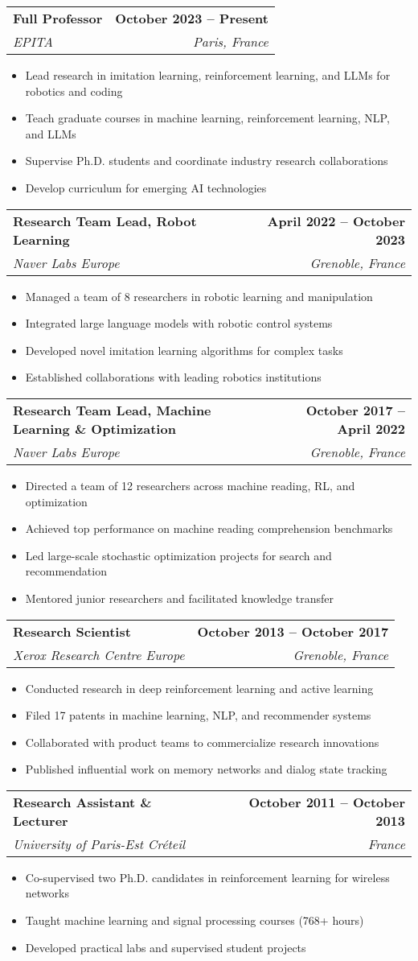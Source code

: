 \documentclass[letterpaper,11pt]{article}
\makeatletter
\newcommand{\resumeItem}[1]{
  \item\small{
    {#1 \vspace{-2pt}}
  }
}
\newcommand{\resumeSubheading}[4]{
  \vspace{-1pt}\item
    \begin{tabular*}{0.97\textwidth}[t]{l@{\extracolsep{\fill}}r}
      \textbf{#1} & \textbf{#2} \\
      \textit{#3} & \textit{#4} \\
    \end{tabular*}\vspace{-8pt}
}
\newcommand{\resumeItemListStart}{\begin{itemize}[leftmargin=0.1in]}
\newcommand{\resumeItemListEnd}{\end{itemize}\vspace{-5pt}}
\makeatother
\begin{document}
    \resumeSubheading
        {Full Professor}{October 2023 -- Present}
        {EPITA}{Paris, France}
        \resumeItemListStart
            \resumeItem{Lead research in imitation learning, reinforcement learning, and LLMs for robotics and coding}
            \resumeItem{Teach graduate courses in machine learning, reinforcement learning, NLP, and LLMs}
            \resumeItem{Supervise Ph.D. students and coordinate industry research collaborations}
            \resumeItem{Develop curriculum for emerging AI technologies}
        \resumeItemListEnd

    \resumeSubheading
        {Research Team Lead, Robot Learning}{April 2022 -- October 2023}
        {Naver Labs Europe}{Grenoble, France}
        \resumeItemListStart
            \resumeItem{Managed a team of 8 researchers in robotic learning and manipulation}
            \resumeItem{Integrated large language models with robotic control systems}
            \resumeItem{Developed novel imitation learning algorithms for complex tasks}
            \resumeItem{Established collaborations with leading robotics institutions}
        \resumeItemListEnd

    \resumeSubheading
        {Research Team Lead, Machine Learning \& Optimization}{October 2017 -- April 2022}
        {Naver Labs Europe}{Grenoble, France}
        \resumeItemListStart
            \resumeItem{Directed a team of 12 researchers across machine reading, RL, and optimization}
            \resumeItem{Achieved top performance on machine reading comprehension benchmarks}
            \resumeItem{Led large-scale stochastic optimization projects for search and recommendation}
            \resumeItem{Mentored junior researchers and facilitated knowledge transfer}
        \resumeItemListEnd

    \resumeSubheading
        {Research Scientist}{October 2013 -- October 2017}
        {Xerox Research Centre Europe}{Grenoble, France}
        \resumeItemListStart
            \resumeItem{Conducted research in deep reinforcement learning and active learning}
            \resumeItem{Filed 17 patents in machine learning, NLP, and recommender systems}
            \resumeItem{Collaborated with product teams to commercialize research innovations}
            \resumeItem{Published influential work on memory networks and dialog state tracking}
        \resumeItemListEnd

    \newpage
    \resumeSubheading
        {Research Assistant \& Lecturer}{October 2011 -- October 2013}
        {University of Paris-Est Créteil}{France}
        \resumeItemListStart
            \resumeItem{Co-supervised two Ph.D. candidates in reinforcement learning for wireless networks}
            \resumeItem{Taught machine learning and signal processing courses (768+ hours)}
            \resumeItem{Developed practical labs and supervised student projects}
        \resumeItemListEnd
\end{document}
